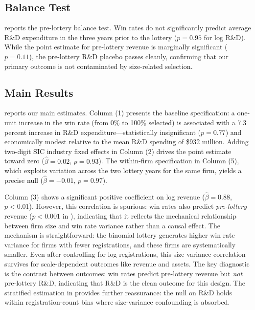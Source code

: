 \documentclass[12pt]{article}
\begin{document}
\subsection{Balance Test}



 reports the pre-lottery balance test. Win rates do not significantly predict average R\&D expenditure in the three years prior to the lottery ($p = 0.95$ for log R\&D). While the point estimate for pre-lottery revenue is marginally significant ($p = 0.11$), the pre-lottery R\&D placebo passes cleanly, confirming that our primary outcome is not contaminated by size-related selection.

\subsection{Main Results}



 reports our main estimates. Column (1) presents the baseline specification: a one-unit increase in the win rate (from 0\% to 100\% selected) is associated with a 7.3 percent increase in R\&D expenditure---statistically insignificant ($p = 0.77$) and economically modest relative to the mean R\&D spending of \$932 million. Adding two-digit SIC industry fixed effects in Column (2) drives the point estimate toward zero ($\hat{\beta} = 0.02$, $p = 0.93$). The within-firm specification in Column (5), which exploits variation across the two lottery years for the same firm, yields a precise null ($\hat{\beta} = -0.01$, $p = 0.97$).

Column (3) shows a significant positive coefficient on log revenue ($\hat{\beta} = 0.88$, $p < 0.01$). However, this correlation is spurious: win rates also predict \emph{pre-lottery} revenue ($p < 0.001$ in ), indicating that it reflects the mechanical relationship between firm size and win rate variance rather than a causal effect. The mechanism is straightforward: the binomial lottery generates higher win rate variance for firms with fewer registrations, and these firms are systematically smaller. Even after controlling for log registrations, this size-variance correlation survives for scale-dependent outcomes like revenue and assets. The key diagnostic is the contrast between outcomes: win rates predict pre-lottery revenue but \emph{not} pre-lottery R\&D, indicating that R\&D is the clean outcome for this design. The stratified estimation in  provides further reassurance: the null on R\&D holds within registration-count bins where size-variance confounding is absorbed.
\end{document}
